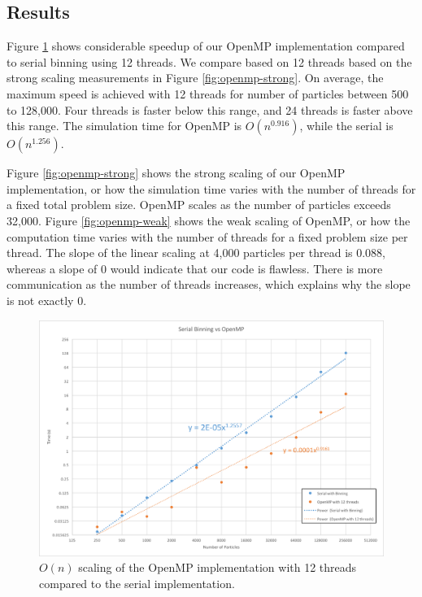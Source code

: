 \documentclass[12pt]{article}
\begin{document}
\subsection{Results}

Figure \ref{fig:openmp-on} shows considerable speedup of our OpenMP implementation compared to serial binning using 12 threads. We compare based on 12 threads based on the strong scaling measurements in Figure \ref{fig:openmp-strong}. On average, the maximum speed is achieved with 12 threads for number of particles between 500 to 128,000. Four threads is faster below this range, and 24 threads is faster above this range. The simulation time for OpenMP is $O(n^{0.916})$, while the serial is $O(n^{1.256})$. 

Figure \ref{fig:openmp-strong} shows the strong scaling of our OpenMP implementation, or how the simulation time varies with the number of threads for a fixed total problem size. OpenMP scales as the number of particles exceeds 32,000. Figure \ref{fig:openmp-weak} shows the weak scaling of OpenMP, or how the computation time varies with the number of threads for a fixed problem size per thread. The slope of the linear scaling at 4,000 particles per thread is 0.088, whereas a slope of 0 would indicate that our code is flawless. There is more communication as the number of threads increases, which explains why the slope is not exactly 0.

\begin{figure}
\includegraphics[width=\textwidth]{graphs/serial_binning_vs_openMP_12thr.png}
  \caption{$O(n)$ scaling of the OpenMP implementation with 12 threads compared to the serial implementation.}
  \label{fig:openmp-on}
\end{figure}
\end{document}
